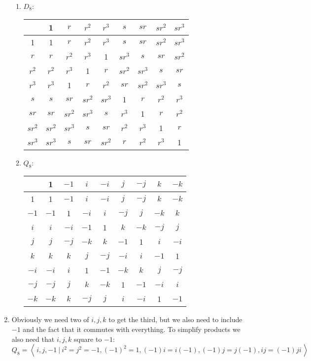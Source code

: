 \documentclass[]{article}
\begin{document}
\begin{enumerate}
\begin{enumerate}
\item $D_8$:
\begin{table}[h!] \centering
\begin{tabular}{c|c|c|c|c|c|c|c|c|}
 & 1 & $r$ & $r^2$ & $r^3$ & $s$ & $sr$ & $sr^2$ & $sr^3$ \\ \hline
1 & 1 & $r$ & $r^2$ & $r^3$ & $s$ & $sr$ & $sr^2$ & $sr^3$ \\ \hline
$r$ & $r$ & $r^2$ & $r^3$ & 1 & $sr^3$ & $s$ & $sr$ & $sr^2$ \\ \hline
$r^2$ & $r^2$ & $r^3$ & 1 & $r$ & $sr^2$ & $sr^3$ & $s$ & $sr$ \\ \hline
$r^3$ & $r^3$ & 1 & $r$ & $r^2$ & $sr$ & $sr^2$ & $sr^3$ & $s$ \\ \hline
$s$ & $s$ & $sr$ & $sr^2$ & $sr^3$ & 1 & $r$ & $r^2$ & $r^3$ \\ \hline
$sr$ & $sr$ & $sr^2$ & $sr^3$ & $s$ & $r^3$ & 1 & $r$ & $r^2$ \\ \hline
$sr^2$ & $sr^2$ & $sr^3$ & $s$ & $sr$ & $r^2$ & $r^3$ & 1 & $r$ \\ \hline
$sr^3$ & $sr^3$ & $s$ & $sr$ & $sr^2$ & $r$ & $r^2$ & $r^3$ & 1 \\ \hline
\end{tabular}
\end{table}


\item $Q_8$:
\begin{table}[h!] \centering
\begin{tabular}{c|c|c|c|c|c|c|c|c|}
 & 1 & $-1$ & $i$ & $-i$ & $j$ & $-j$ & $k$ & $-k$ \\ \hline
1 & 1 & $-1$ & $i$ & $-i$ & $j$ & $-j$ & $k$ & $-k$ \\ \hline
$-1$ & $-1$ & 1 & $-i$ & $i$ & $-j$ & $j$ & $-k$ & $k$ \\ \hline
$i$ & $i$ & $-i$ & $-1$ & 1 & $k$ & $-k$ & $-j$ & $j$ \\ \hline
$j$ & $j$ & $-j$ & $-k$ & $k$ & $-1$ & 1 & $i$ & $-i$ \\ \hline
$k$ & $k$ & $k$ & $j$ & $-j$ & $-i$ & $i$ & $-1$ & 1 \\ \hline
$-i$ & $-i$ & $i$ & 1 & $-1$ & $-k$ & $k$ & $j$ & $-j$ \\ \hline
$-j$ & $-j$ & $j$ & $k$ & $-k$ & 1 & $-1$ & $-i$ & $i$ \\ \hline
$-k$ & $-k$ & $k$ & $-j$ & $j$ & $i$ & $-i$ & 1 & $-1$ \\ \hline
\end{tabular}
\end{table}

\end{enumerate}


\item Obviously we need two of $i,j,k$ to get the third, but we also need to include $-1$ and the fact that it commutes with everything. To simplify products we also need that $i,j,k$ square to $-1$:
\begin{equation}
Q_8 = \left\langle\, i,j,-1 \ \vert\ i^2=j^2=-1, (-1)^2=1, (-1)i=i(-1), (-1)j=j(-1), ij=(-1)ji\, \right\rangle
\end{equation}


\end{enumerate}
\end{document}
